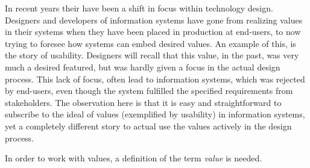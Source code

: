 In recent years their have been a shift in focus within technology design. Designers and developers of information systems have gone from realizing values in their systems when they have been placed in production at end-users, to now trying to foresee how systems can embed desired values.\newline 
An example of this, is the story of usability. Designers will recall that this value, in the past, was very much a desired featured, but was hardly given a focus in the actual design process. This lack of focus, often lead to information systems, which was rejected by end-users, even though the system fulfilled the specified requirements from stakeholders.\newline
The observation here is that it is easy and straightforward to subscribe to the ideal of values (exemplified by usability) in information systems, yet a completely different story to actual use the values actively in the design process.

In order to work with values, a definition of the term \textit{value} is needed. 
 \newline



